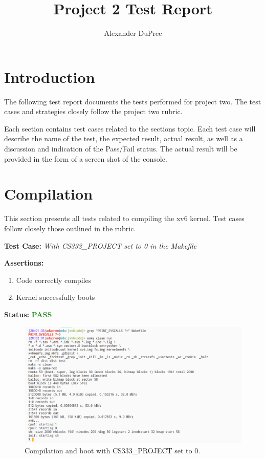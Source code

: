 \documentclass[11pt,letterpaper]{report}
\begin{document}
\title{Project 2 Test Report}
\author{Alexander DuPree}

\ifdefined \LF
{\Large     %
\fi

  \maketitle
  \section*{Introduction}
  \noindent
  The following test report documents the tests performed for project two. The test cases and strategies closely follow the project two rubric. 

  Each section contains test cases related to the sections topic. Each test case will describe the name of the test, 
  the expected result, actual result, as well as a discussion and indication of the Pass/Fail status. 
  The actual result will be provided in the form of a screen shot of the console. 

  \section*{Compilation}
  This section presents all tests related to compiling the xv6 kernel.
  Test cases follow closely those outlined in the rubric. \hfill \break
  
  \noindent\textbf{Test Case:} \emph{With CS333\_PROJECT set to 0 in the Makefile}
  
  \noindent\textbf{Assertions:}
  \begin{enumerate}[]
  \item Code correctly compiles
  \item Kernel successfully boots
  \end{enumerate}  
  
  \noindent\textbf{Status:} \textcolor{ForestGreen}{\textbf{PASS}}
  
  \begin{figure}[h!]
	\centering
	\includegraphics[width=1\linewidth]{test1.png}
	\caption[img]{Compilation and boot with CS333\_PROJECT set to 0.}
	\label{fig:P1compileP0-1}
  \end{figure}

}
\end{document}
